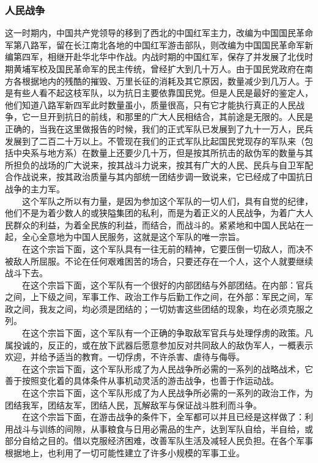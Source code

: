 \documentclass[cn,11pt,chinese]{elegantbook}
\def\myformat#1{\hfil\hfil #1}
\begin{document}
\subsubsection*{\myformat{人民战争}}
这一时期内，中国共产党领导的移到了西北的中国红军主力，改编为中国国民革命军第八路军，留在长江南北各地的中国红军游击部队，则改编为中国国民革命军新编第四军，相继开赴华北华中作战。内战时期的中国红军，保存了并发展了北伐时期黄埔军校及国民革命军的民主传统，曾经扩大到几十万人。由于国民党政府在南方各根据地内的残酷的摧毁、万里长征的消耗及其它原因，数量减少到几万人。于是有些人看不起这枝军队，以为抗日主要依靠国民党。但是人民是最好的鉴定人，他们知道八路军新四军此时数量虽小，质量很高，只有它才能执行真正的人民战争，它一旦开到抗日的前线，和那里的广大人民相结合，其前途是无限的。人民是正确的，当我在这里做报告的时候，我们的正式军队已发展到了九十一万人，民兵发展到了二百二十万以上。不管现在我们的正式军队比起国民党现存的军队来（包括中央系与地方系）在数量上还要少几十万，但是按其所抗击的敌伪军的数量与其所担负的战场的广大说来，按其战斗力说来，按其有广大的人民、民兵与自卫军配合作战说来，按其政治质量与其内部统一团结步调一致说来，它已经成了中国抗日战争的主力军。\\
　　这个军队之所以有力量，是因为参加这个军队的一切人们，具有自觉的纪律，他们不是为着少数人的或狭隘集团的私利，而是为着正义的人民战争，为着广大人民群众的利益，为着全民族的利益，而结合，而战斗的。紧紧地和中国人民站在一起，全心全意地为中国人民服务，这就是这个军队的唯一宗旨。\\
　　在这个宗旨下面，这个军队具有一往无前的精神，它要压倒一切敌人，而决不被敌人所屈服。不论在任何艰难困苦的场合，只要还存在一个人，这个人就要继续战斗下去。\\
　　在这个宗旨下面，这个军队有一个很好的内部团结与外部团结。在内部：官兵之间，上下级之间，军事工作、政治工作与后勤工作之间，在外部：军民之间，军政之间，我友之间，均必须是团结的；一切妨害这些团结的现象，均在必须克服之列。\\
　　在这个宗旨下面，这个军队有一个正确的争取敌军官兵与处理俘虏的政策。凡属投诚的，反正的，或在放下武器后愿意参加反对共同敌人的敌伪军人，一概表示欢迎，并给予适当的教育。一切俘虏，不许杀害、虐待与侮辱。\\
　　在这个宗旨下面，这个军队形成了为人民战争所必需的一系列的战略战术，它善于按照变化着的具体条件从事机动灵活的游击战争，也善于作运动战。\\
　　在这个宗旨下面，这个军队形成了为人民战争所必需的一系列的政治工作，为团结我军，团结友军，团结人民，瓦解敌军与保证战斗胜利而斗争。\\
　　在这个宗旨下面，在游击战争的条件下，全军都可以并且已经是这样做了：利用战斗与训练的间隙，从事粮食与日用必需品的生产，达到军队自给，半自给，或部分自给之目的。借以克服经济困难，改善军队生活及减轻人民负担。在各个军事根据地上，也利用了一切可能性建立了许多小规模的军事工业。\\
\end{document}
